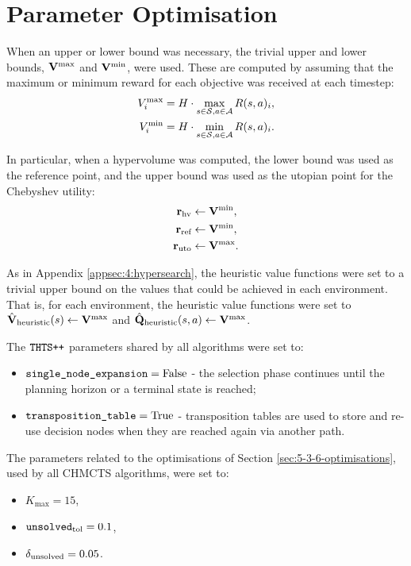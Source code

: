 \section{Parameter Optimisation}
\label{appsec:5:hypersearch}

    When an upper or lower bound was necessary, the trivial upper and lower bounds, $\mathbf{V}^{\max}$ and $\mathbf{V}^{\min}$, were used. These are computed by assuming that the maximum or minimum reward for each objective was received at each timestep:
    \begin{align}
        V^{\max}_i &= H \cdot \max_{s\in\mathcal{S},a\in\mathcal{A}} R(s,a)_i, \\
        V^{\min}_i &= H \cdot \min_{s\in\mathcal{S},a\in\mathcal{A}} R(s,a)_i.
    \end{align}

    In particular, when a hypervolume was computed, the lower bound was used as the reference point, and the upper bound was used as the utopian point for the Chebyshev utility:
    \begin{align}
        \mathbf{r}_{\text{hv}} &\leftarrow \mathbf{V}^{\min}, \\
        \mathbf{r}_{\textnormal{ref}} &\leftarrow \mathbf{V}^{\min}, \\
        \mathbf{r}_{\textnormal{uto}} &\leftarrow \mathbf{V}^{\max}.
    \end{align}

    As in Appendix \ref{appsec:4:hypersearch}, the heuristic value functions were set to a trivial upper bound on the values that could be achieved in each environment. That is, for each environment, the heuristic value functions were set to ${\hat{\mathbf{V}}_{\textnormal{heuristic}}}(s) \leftarrow \mathbf{V}^{\max}$ and ${\hat{\mathbf{Q}}_{\textnormal{heuristic}}}(s,a) \leftarrow \mathbf{V}^{\max}$.

    The ${\textnormal{\texttt{THTS++}}}$ parameters shared by all algorithms were set to:
    \begin{itemize}
        \item ${\textnormal{\texttt{single\_node\_expansion}}}=\text{False}$ - the selection phase continues until the planning horizon or a terminal state is reached;
        \item ${\textnormal{\texttt{transposition\_table}}}=\text{True}$ - transposition tables are used to store and re-use decision nodes when they are reached again via another path.
    \end{itemize}


    The parameters related to the optimisations of Section \ref{sec:5-3-6-optimisations}, used by all CHMCTS algorithms, were set to:
    \begin{itemize}
        \item $K_{\max} = 15$, 
        \item ${\textnormal{\texttt{unsolved}}_{\textnormal{tol}}} = 0.1$, 
        \item ${\delta_{\textnormal{unsolved}}} = 0.05$.
    \end{itemize}

